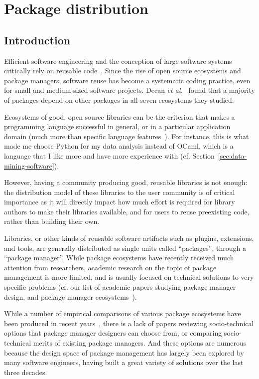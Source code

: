 \chapter{Package distribution}

\label{chap:distribution}

\section{Introduction}

Efficient software engineering and the conception of large software systems critically rely on reusable code~\cite{Sametinger:1997:SER:260943}.
Since the rise of open source ecosystems and package managers, software reuse has become a systematic coding practice, even for small and medium-sized software projects.
Decan \emph{et al.}~\cite{decan2019empirical} found that a majority of packages depend on other packages in all seven ecosystems they studied.

Ecosystems of good, open source libraries can be the criterion that makes a programming language successful in general, or in a particular application domain (much more than specific language features~\cite{meyerovich2013empirical}).
For instance, this is what made me choose Python for my data analysis instead of OCaml, which is a language that I like more and have more experience with (cf. Section~\ref{sec:data-mining-software}).

However, having a community producing good, reusable libraries is not enough: the distribution model of these libraries to the user community is of critical importance as it will directly impact how much effort is required for library authors to make their libraries available, and for users to reuse preexisting code, rather than building their own.

Libraries, or other kinds of reusable software artifacts such as plugins, extensions, and tools, are generally distributed as single units called ``packages'', through a ``package manager''.
While package ecosystems have recently received much attention from researchers, academic research on the topic of package management is more limited, and is usually focused on technical solutions to very specific problems (cf. our list of academic papers studying package manager design, and package manager ecosystems~\cite{nesbitt2019papers}).

While a number of empirical comparisons of various package ecosystems have been produced in recent years~\cite{bogart2016break,decan2016topology,kikas2017structure,Bogart2017,decan2019empirical,dietrich2019dependency,decan2019package}, there is a lack of papers reviewing socio-technical options that package manager designers can choose from, or comparing socio-technical merits of existing package managers.
And these options are numerous because the design space of package management has largely been explored by many software engineers, having built a great variety of solutions over the last three decades.

